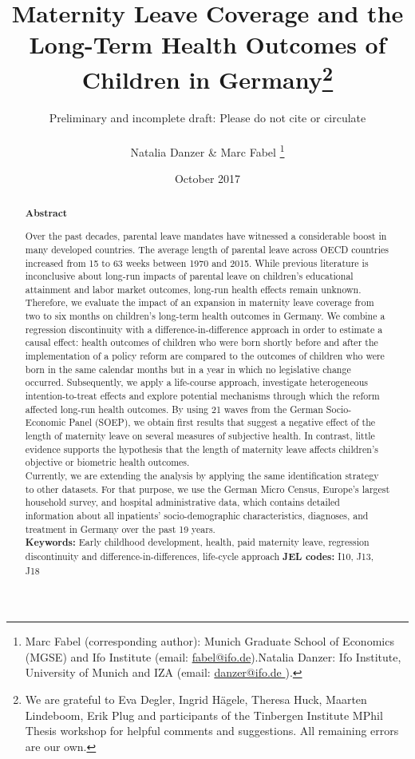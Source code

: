 \documentclass[a4paper ]{article}
\title{Maternity Leave Coverage and the Long-Term Health Outcomes of Children in Germany\footnote{We are grateful to Eva Degler, Ingrid H\"agele, Theresa Huck, Maarten Lindeboom, Erik Plug and participants of the Tinbergen Institute MPhil Thesis workshop for helpful comments and suggestions. All remaining errors are our own.}
}
\author{{\color{red}Preliminary and incomplete draft: Please do not cite or circulate}\\ \\
Natalia Danzer \& Marc Fabel \thanks{Marc Fabel (corresponding author): Munich Graduate School of Economics (MGSE) and Ifo Institute (email: \href{mailto:fabel@ifo.de}{fabel@ifo.de}).\newline Natalia Danzer: Ifo Institute, University of Munich and IZA (email: \href{mailto:danzer@ifo.de }{danzer@ifo.de }).}}
\date{October 2017}
\renewcommand{\headrulewidth}{0.5pt}
\begin{document}
\thispagestyle{empty}\fancyhf{}
\rhead{}
\renewcommand{\headrulewidth}{0.5pt}



%

\newpage

\clearpage
\setcounter{page}{1}    
\rhead{\thepage}

        \newpage

\renewcommand{\abstractname}{\vspace{-\baselineskip}}	%
\maketitle
    \begin{abstract}\noindent 
   \footnotesize{\begin{center}\textbf{Abstract}\end{center} Over the past decades, parental leave mandates have witnessed a considerable boost in many developed countries. The average length of parental leave across OECD countries increased from 15 to 63 weeks between 1970 and 2015. While previous literature is inconclusive about long-run impacts of parental leave on children's educational attainment and labor market outcomes, long-run health effects remain unknown. Therefore, we evaluate the impact of an expansion in maternity leave coverage from two to six months on children's long-term health outcomes in Germany. We combine a regression discontinuity with a difference-in-difference approach in order to estimate a causal effect: health outcomes of children who were born shortly before and after the implementation of a policy reform are compared to the outcomes of children who were born in the same calendar months but in a year in which no legislative change occurred. Subsequently, we apply a life-course approach, investigate heterogeneous intention-to-treat effects and explore potential mechanisms through which the reform affected long-run health outcomes. By using 21 waves from the German Socio-Economic Panel (SOEP), we obtain first results that suggest a negative effect of the length of maternity leave on several measures of subjective health. In contrast, little evidence supports the hypothesis that the length of maternity leave affects children's objective or biometric health outcomes.\newline\\ Currently, we are extending the analysis by applying the same identification strategy to other datasets. For that purpose, we use the German Micro Census, Europe's largest household survey, and hospital administrative data, which contains detailed information about all inpatients' socio-demographic characteristics, diagnoses, and treatment in Germany over the past 19 years.%
   \\\newline \textbf{Keywords:} Early childhood development, health, paid maternity leave, regression discontinuity and difference-in-differences, life-cycle approach \newline \textbf{JEL codes:} I10, J13, J18}
    \end{abstract}
    
\end{document}
